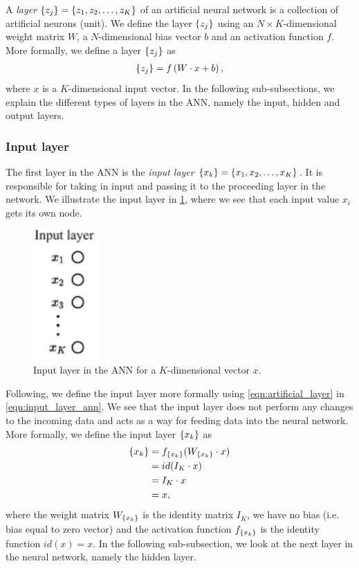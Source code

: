 A \textit{layer} $\left\{ {z}_{j} \right\} = \left\{ z_1, z_2, \ldots, z_K \right\}$ of an artificial neural network is a collection of artificial neurons (unit). We define the layer $\left\{ {z}_{j} \right\}$ using an $N \times K$-dimensional weight matrix $W$, a $N$-dimensional bias vector $b$ and an activation function $f$. More formally, we define a layer $\left\{ {z}_{j} \right\}$ as
\begin{align}
    \left\{ {z}_{j} \right\} = f \left( W \cdot x + b \right),
    \label{eqn:artificial_layer}
\end{align}
where $x$ is a $K$-dimensional input vector. In the following sub-subsections, we explain the different types of layers in the ANN, namely the input, hidden and output layers.

\subsubsection{Input layer}
\label{sec:ann-input-layer}
The first layer in the ANN is the \textit{input layer} $\left\{ {x}_{k} \right\} = \left\{ x_1, x_2, \ldots, x_K \right\}$. It is responsible for taking in input and passing it to the proceeding layer in the network. We illustrate the input layer in \cref{fig:input_layer_ann}, where we see that each input value $x_i$ gets its own node.
\begin{figure}[H]
    \centering
    \includegraphics[height=5cm]{thesis/figures/artificial-neural-network-input-layer_cropped.pdf}
    \caption{Input layer in the ANN for a $K$-dimensional vector $x$.}
    \label{fig:input_layer_ann}
\end{figure}
Following, we define the input layer more formally using \cref{eqn:artificial_layer} in \cref{eqn:input_layer_ann}. We see that the input layer does not perform any changes to the incoming data and acts as a way for feeding data into the neural network. More formally, we define the input layer $\left\{ {x}_{k} \right\}$ as
\begin{align}
    \label{eqn:input_layer_ann}
    \left\{ {x}_{k} \right\}
    &= f_{\left\{ {x}_{k} \right\}}(W_{\left\{ {x}_{k} \right\}} \cdot x) \\
    &= id(I_K \cdot x) \notag \\ 
    &= I_K \cdot x \notag \\
    &= x, \notag
\end{align}
where the weight matrix $W_{\left\{ {x}_{k} \right\}}$ is the identity matrix $I_K$, we have no bias (i.e. bias equal to zero vector) and the activation function $f_{\left\{ {x}_{k} \right\}}$ is the identity function $id(x)=x$. In the following sub-subsection, we look at the next layer in the neural network, namely the hidden layer.

